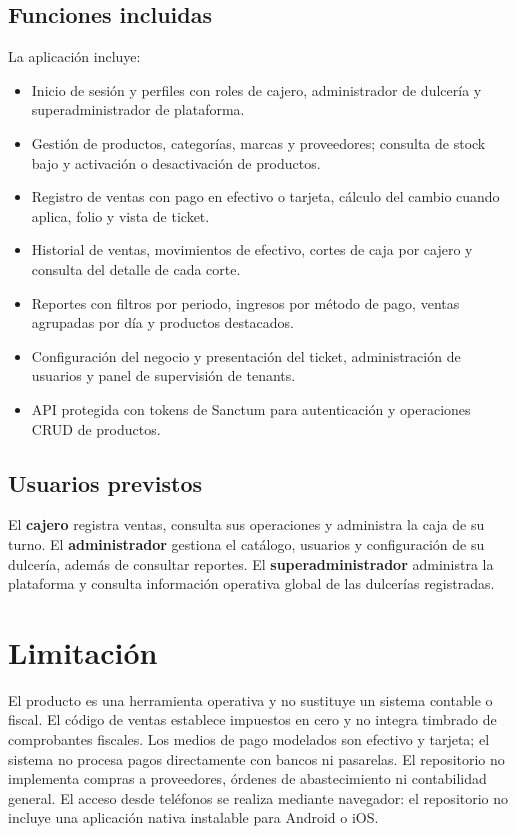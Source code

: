 \subsection{Funciones incluidas}
La aplicación incluye:
\begin{itemize}
  \item Inicio de sesión y perfiles con roles de cajero, administrador de dulcería y superadministrador de plataforma.
  \item Gestión de productos, categorías, marcas y proveedores; consulta de stock bajo y activación o desactivación de productos.
  \item Registro de ventas con pago en efectivo o tarjeta, cálculo del cambio cuando aplica, folio y vista de ticket.
  \item Historial de ventas, movimientos de efectivo, cortes de caja por cajero y consulta del detalle de cada corte.
  \item Reportes con filtros por periodo, ingresos por método de pago, ventas agrupadas por día y productos destacados.
  \item Configuración del negocio y presentación del ticket, administración de usuarios y panel de supervisión de tenants.
  \item API protegida con tokens de Sanctum para autenticación y operaciones CRUD de productos.
\end{itemize}

\subsection{Usuarios previstos}
El \textbf{cajero} registra ventas, consulta sus operaciones y administra la caja de su turno. El \textbf{administrador} gestiona el catálogo, usuarios y configuración de su dulcería, además de consultar reportes. El \textbf{superadministrador} administra la plataforma y consulta información operativa global de las dulcerías registradas.

\section{Limitación}

El producto es una herramienta operativa y no sustituye un sistema contable o fiscal. El código de ventas establece impuestos en cero y no integra timbrado de comprobantes fiscales. Los medios de pago modelados son efectivo y tarjeta; el sistema no procesa pagos directamente con bancos ni pasarelas. El repositorio no implementa compras a proveedores, órdenes de abastecimiento ni contabilidad general. El acceso desde teléfonos se realiza mediante navegador: el repositorio no incluye una aplicación nativa instalable para Android o iOS.

